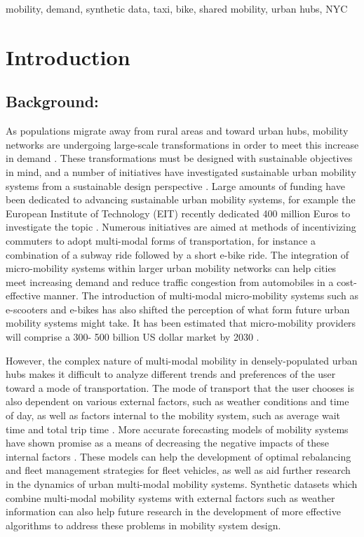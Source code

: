 \documentclass[conference]{IEEEtran}
\begin{document}
\begin{IEEEkeywords}
mobility, demand, synthetic data, taxi, bike, shared mobility, urban hubs, NYC
\end{IEEEkeywords}

\section{Introduction}
\subsection{Background:}
As populations migrate away from rural areas and toward urban hubs, mobility 
networks are undergoing large-scale transformations in order to meet this increase 
in demand \cite{secretary_general_sustainable_2018}. These transformations must be 
designed with sustainable objectives in mind, and a number of initiatives have 
investigated sustainable urban mobility systems from a sustainable design perspective
\cite{ghorbanzadeh_sustainable_2019} \cite{canitez_sustainable_2020} \cite{ortuzar_sustainable_2019}. 
Large amounts of funding have been dedicated to advancing sustainable urban mobility 
systems, for example the European Institute of Technology (EIT) recently dedicated 
400 million Euros to investigate the topic \cite{noauthor_eit_nodate}. Numerous initiatives 
are aimed at methods of incentivizing commuters to adopt multi-modal forms of transportation, 
for instance a combination of a subway ride followed by a short e-bike ride. The integration 
of micro-mobility systems within larger urban mobility networks can help cities meet 
increasing demand and reduce traffic congestion from automobiles in a cost-effective 
manner. The introduction of multi-modal micro-mobility systems such as e-scooters and 
e-bikes has also shifted the perception of what form future urban mobility systems might 
take. It has been estimated that micro-mobility providers will comprise a 300- 500 billion 
US dollar market by 2030 \cite{noauthor_future_nodate}.

However, the complex nature of multi-modal mobility in densely-populated urban hubs makes it 
difficult to analyze different trends and preferences of the user toward a mode of transportation. 
The mode of transport that the user chooses is also dependent on various external factors, such as 
weather conditions and time of day, as well as factors internal to the mobility system, such as 
average wait time and total trip time \cite{frank_urban_2008} \cite{beimborn_accessibility_2003}. 
More accurate forecasting models of mobility systems have shown promise as a means of decreasing the 
negative impacts of these internal factors \cite{iglesias_data-driven_2017}. These models can help the 
development of optimal rebalancing and fleet management strategies for fleet vehicles, as well as aid 
further research in the dynamics of urban multi-modal mobility systems. Synthetic datasets which combine
multi-modal mobility systems with external factors such as weather information can also help future 
research in the development of more effective algorithms to address these problems in mobility system 
design.
\end{document}
